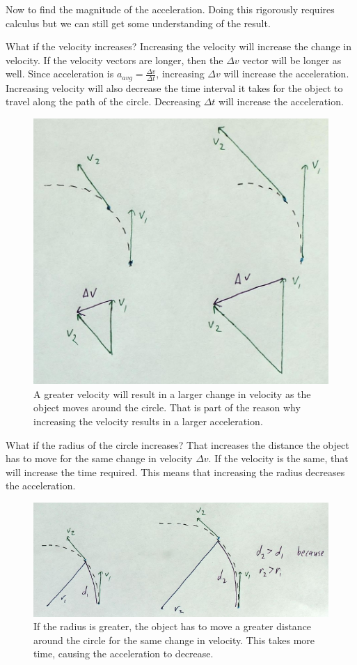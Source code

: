\documentclass[12pt]{book}
\begin{document}
Now to find the magnitude of the acceleration. Doing this rigorously requires calculus but we can still get some understanding of the result.

What if the velocity increases? Increasing the velocity will increase the change in velocity. If the velocity vectors are longer, then the $\Delta v$ vector will be longer as well. Since acceleration is $a_{avg} = \frac{\Delta v}{\Delta t}$, increasing $\Delta v$ will increase the acceleration. Increasing velocity will also decrease the time interval it takes for the object to travel along the path of the circle. Decreasing $\Delta t$ will increase the acceleration.

\begin{figure}[H]
\centering
\includegraphics[scale=0.6]{ucm_dv_vel.png}
\caption{A greater velocity will result in a larger change in velocity as the object moves around the circle. That is part of the reason why increasing the velocity results in a larger acceleration.}
\end{figure}

What if the radius of the circle increases? That increases the distance the object has to move for the same change in velocity $\Delta v$. If the velocity is the same, that will increase the time required. This means that increasing the radius decreases the acceleration.

\begin{figure}
\centering
\includegraphics[scale=0.6]{ucm_dv_radius.png}
\caption{If the radius is greater, the object has to move a greater distance around the circle for the same change in velocity. This takes more time, causing the acceleration to decrease.}
\end{figure}
\end{document}
